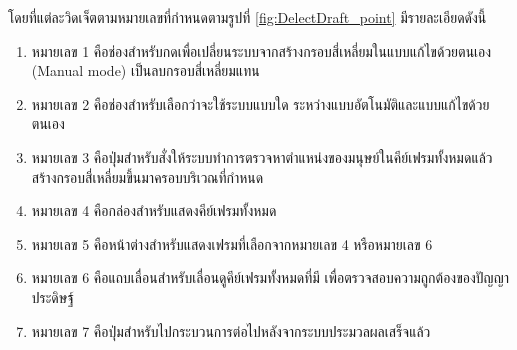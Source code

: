 โดยที่แต่ละวิดเจ็ตตามหมายเลขที่กำหนดตามรูปที่ \ref{fig:DelectDraft_point} มีรายละเอียดดังนี้
\begin{enumerate}
	\setlength\itemsep{-0.25em}
    \item หมายเลข 1 คือช่องสำหรับกดเพื่อเปลี่ยนระบบจากสร้างกรอบสี่เหลี่ยมในแบบแก้ไขด้วยตนเอง (Manual mode) เป็นลบกรอบสี่เหลี่ยมแทน
    \item หมายเลข 2 คือช่องสำหรับเลือกว่าจะใช้ระบบแบบใด ระหว่างแบบอัตโนมัติและแบบแก้ไขด้วยตนเอง
    \item หมายเลข 3 คือปุ่มสำหรับสั่งให้ระบบทำการตรวจหาตำแหน่งของมนุษย์ในคีย์เฟรมทั้งหมดแล้วสร้างกรอบสี่เหลี่ยมขึ้นมาครอบบริเวณที่กำหนด
	\item หมายเลข 4 คือกล่องสำหรับแสดงคีย์เฟรมทั้งหมด
	\item หมายเลข 5 คือหน้าต่างสำหรับแสดงเฟรมที่เลือกจากหมายเลข 4 หรือหมายเลข 6
	\item หมายเลข 6 คือแถบเลื่อนสำหรับเลื่อนดูคีย์เฟรมทั้งหมดที่มี เพื่อตรวจสอบความถูกต้องของปัญญาประดิษฐ์
	\item หมายเลข 7 คือปุ่มสำหรับไปกระบวนการต่อไปหลังจากระบบประมวลผลเสร็จแล้ว
\end{enumerate}
\clearpage

